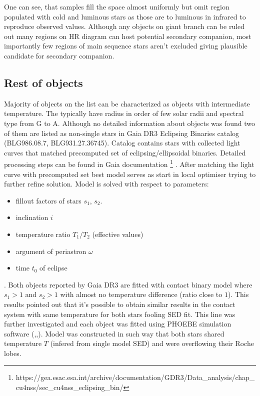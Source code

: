 \documentclass{pracalicmgr}
\begin{document}
One can see, that samples fill the space almost uniformly but omit region populated with cold and luminous stars as 
those are to luminous in infrared to reproduce observed values.
Although  any objects on giant branch can be ruled out many regions on HR diagram can host potential secondary companion, most importantly
few regions of main sequence stars aren't excluded giving plausible candidate for secondary companion.
\subsection{Rest of objects}
Majority of objects on the list can be characterized as objects with intermediate temperature. The typically have radius in order of 
few solar radii and spectral type from G to A. Although no detailed information about objects was found two of them
are listed as non-single stars in Gaia DR3 Eclipsing Binaries catalog (BLG986.08.7, BLG931.27.36745).
Catalog contains stars with collected light curves that matched precomputed set of eclipsing/ellipsoidal binaries. 
Detailed processing steps can be found in Gaia documentation \footnote[1]{https://gea.esac.esa.int/archive/documentation/GDR3/Data\_analysis/chap\_cu4nss/sec\_cu4nss\_eclipsing\_bin/}
. After matching the light curve with precomputed set best model serves as start in local optimiser 
trying to further refine solution. Model is solved with respect to parameters:
\begin{itemize}
    \item fillout factors of stars $s_1$, $s_2$.
    \item inclination $i$
    \item temperature ratio $T_1/T_2$ (effective values)
    \item argument of periastron $\omega$
    \item time $t_0$ of eclipse
\end{itemize}. 
Both objects reported by Gaia DR3 are fitted with contact binary model where $s_1>1$ and $s_2>1$ with almost no 
temperature difference (ratio close to $1$). This results pointed out that it's possible to obtain similar results 
in the contact system with same temperature for both stars fooling SED fit. 
This line was further investigated and each object was fitted using 
PHOEBE simulation software (\citet*{wilson_realization_1971},\citet*{prsa_computational_2005},\citet*{conroy_physics_2020}). Model was constructed in such way that both stars shared temperature $T$ (infered from 
single model SED) and were overflowing their Roche lobes.
\end{document}
